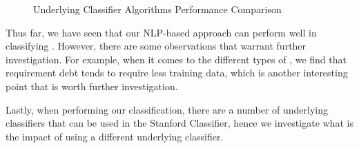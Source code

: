 \begin{figure}[!thb]
  \centering
  \caption{Underlying Classifier Algorithms Performance Comparison}
  \label{fig:algorithms_comparison}
\end{figure}

Thus far, we have seen that our NLP-based approach can perform well in classifying \SATD. However, there are some observations that warrant further investigation. For example, when it comes to the different types of \SATD, we find that requirement debt tends to require less training data, which is another interesting point that is worth further investigation. 


 Lastly, when performing our classification, there are a number of underlying classifiers that can be used in the Stanford Classifier, hence we investigate what is the impact of using a different underlying classifier. 

